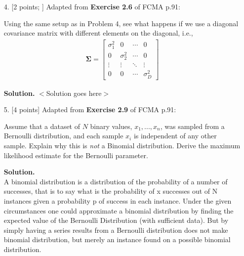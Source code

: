 \documentclass[10pt]{article}
\begin{document}
\begin{itemize}
{\bf Solution.} 

\begin{eqnarray*}
p(\mathbf{w}) = \frac{1}{(2 \pi)^{D/2} {{\begin{bmatrix} \sigma^2 & 0\\ 0 & \sigma^2 \end{bmatrix}} } ^{1/2}} \exp \left\{ -\frac{1}{2} (\mathbf{w} - \mathbf{\mu})^\top \mathbf{{\begin{bmatrix} {1 \over \sigma^2} & 0\\ 0 & { 1 \over \sigma^2} \end{bmatrix}} }(\mathbf{w} - \mathbf{\mu}) \right\} .
\end{eqnarray*}


\item[4.] [2 points; \boldred{Required only for Graduates}]
Adapted from {\bf Exercise 2.6} of FCMA p.91:

Using the same setup as in Problem 4, see what happens if we use a diagonal covariance matrix with different elements on the diagonal, i.e.,
\begin{eqnarray*}
\mathbf{\Sigma} = 
\begin{bmatrix}
\sigma_1^2 & 0 & \cdots & 0 \\
0 & \sigma_2^2 & \cdots & 0 \\
\vdots & \vdots & \ddots & \vdots \\
0 & 0 & \cdots & \sigma_D^2
\end{bmatrix}
\end{eqnarray*}

{\bf Solution.} $<$Solution goes here$>$


\item[5.] [4 points]
Adapted from {\bf Exercise 2.9} of FCMA p.91:

Assume that a dataset of $N$ binary values, $x_1, ..., x_n$, was sampled from a Bernoulli distribution, and each sample $x_i$ is independent of any other sample.  Explain why this is {\em not} a Binomial distribution.  Derive the maximum likelihood estimate for the Bernoulli parameter.

{\bf Solution.} 
\\ A binomial distribution is a distribution of the probability of a number of successes, that is to say what is the probability of x successes out of N instances given a probability p of success in each instance. Under the given circumstances one could approximate a binomial distribution by finding the expected value of the Bernoulli Distribution (with sufficient data).  But by simply having a series results from a Bernoulli distribution does not make binomial distribution, but merely an instance found on a possible binomial distribution.  


\end{itemize}
\end{document}
